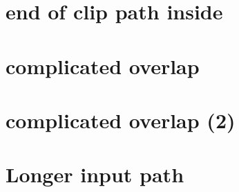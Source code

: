 \documentclass[a4paper]{article}
\begin{document}
	\section{end of clip path inside}
	\def\clippath{%
		\pgfsyssoftpath@movetotoken {10.0pt}{40.0pt}%
		\pgfsyssoftpath@linetotoken {10.0pt}{-40pt}%
		\pgfsyssoftpath@linetotoken {130.0pt}{-40pt}%
		\pgfsyssoftpath@linetotoken {130.0pt}{40pt}%
		\pgfsyssoftpath@linetotoken {10.0pt}{40pt}%
	}%
	\def\expected{%
		\pgfsyssoftpath@movetotoken {56.90549pt}{0.0pt}%
		\pgfsyssoftpath@linetotoken {85.35823pt}{28.45274pt}%
		\pgfsyssoftpath@linetotoken {113.81097pt}{0.0pt}%
		\pgfsyssoftpath@linetotoken {130.0119pt}{16.18913pt}%
	}
	\TESTCASE

	\section{complicated overlap}
	\def\clippath{%
		\pgfsyssoftpath@movetotoken {80.0pt}{15.0pt}%
		\pgfsyssoftpath@linetotoken {80.0pt}{-15pt}%
		\pgfsyssoftpath@linetotoken {130.0pt}{-15pt}%
		\pgfsyssoftpath@linetotoken {130.0pt}{15pt}%
		\pgfsyssoftpath@linetotoken {80.0pt}{15pt}%
	}%
	\def\expected{%
		\pgfsyssoftpath@movetotoken {98.8214pt}{15.00137pt}%
		\pgfsyssoftpath@linetotoken {113.81097pt}{0.0pt}%
		\pgfsyssoftpath@linetotoken {128.82414pt}{15.00137pt}%
	}
	\TESTCASE

	\section{complicated overlap (2)}
	\def\clippath{%
		\pgfsyssoftpath@movetotoken {80.0pt}{15.0pt}%
		\pgfsyssoftpath@linetotoken {80.0pt}{-15pt}%
		\pgfsyssoftpath@linetotoken {200.0pt}{-15pt}%
		\pgfsyssoftpath@linetotoken {200.0pt}{15pt}%
		\pgfsyssoftpath@linetotoken {80.0pt}{15pt}%
	}%
	\def\expected{%
		\pgfsyssoftpath@movetotoken {98.8214pt}{15.00137pt}%
		\pgfsyssoftpath@linetotoken {113.81097pt}{0.0pt}%
		\pgfsyssoftpath@linetotoken {128.82414pt}{15.00137pt}%
		\pgfsyssoftpath@movetotoken {155.73279pt}{15.00137pt}%
		\pgfsyssoftpath@linetotoken {170.71646pt}{0.0pt}%
	}
	\TESTCASE


	\section{Longer input path}
	\def\inputValue{%
\pgfsyssoftpath@movetotoken {12.5pt}{135.00061pt}\pgfsyssoftpath@linetotoken {69.79164pt}{26.8852pt}\pgfsyssoftpath@linetotoken {74.99998pt}{26.12915pt}\pgfsyssoftpath@linetotoken {80.20831pt}{26.8852pt}\pgfsyssoftpath@linetotoken {137.49997pt}{135.00053pt}%
	}
	\def\clippath{%
		\pgfsyssoftpath@movetotoken {75.0pt}{-17.41943pt}\pgfsyssoftpath@linetotoken {75.0pt}{200.32349pt}\pgfsyssoftpath@linetotoken {175.0pt}{200.32349pt}\pgfsyssoftpath@linetotoken {175.0pt}{-17.41943pt}\pgfsyssoftpath@closepathtoken {75.0pt}{-17.41943pt}%
	}
	\def\expected{%
		\pgfsyssoftpath@movetotoken {75.01404pt}{26.13422pt}\pgfsyssoftpath@linetotoken {74.99998pt}{26.12915pt}\pgfsyssoftpath@linetotoken {80.20831pt}{26.8852pt}\pgfsyssoftpath@linetotoken {137.49997pt}{135.00053pt}%
	}%
	\TESTCASE
\end{document}
